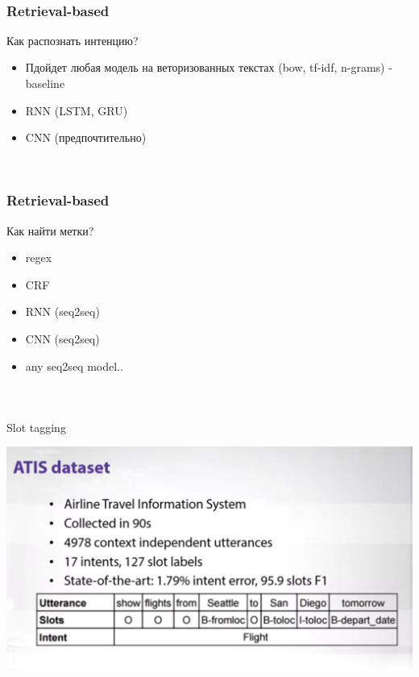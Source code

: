 \documentclass[t, 11pt]{beamer}
\begin{document}
\begin{frame}\
	\frametitle{\insertsection}
	\frametitle{Retrieval-based}
	
	
	
	Как распознать интенцию? 
	
	\begin{itemize}
		\item Пдойдет любая модель на веторизованных текстах (bow, tf-idf, n-grams) - baseline
		\item RNN (LSTM, GRU)
		\item CNN (предпочтительно)
	\end{itemize}
	
	
\end{frame}

\begin{frame}\
	\frametitle{\insertsection}
	\frametitle{Retrieval-based}
	
	
	
	Как найти метки? 
	
	\begin{itemize}
		\item regex
		\item CRF
		\item RNN (seq2seq)
		\item CNN (seq2seq)
		\item any seq2seq model..
	\end{itemize}
	
	
\end{frame}


\begin{frame}\
	\frametitle{\insertsection}
	\frametitle{\insertsubsection}
	Slot tagging
	
	\includegraphics[width=0.9\linewidth]{ex1.png}
	
	
	
	
\end{frame}
\end{document}
